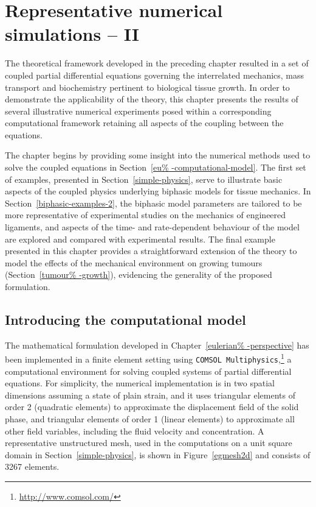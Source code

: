 \chapter{Representative numerical simulations -- II}
\label{numerical-simulations-2}

The theoretical framework developed in the preceding chapter resulted
in a set of coupled partial differential equations governing the
interrelated mechanics, mass transport and biochemistry pertinent to
biological tissue growth. In order to demonstrate the applicability of
the theory, this chapter presents the results of several illustrative
numerical experiments posed within a corresponding computational
framework retaining all aspects of the coupling between the equations.

The chapter begins by providing some insight into the numerical
methods used to solve the coupled equations in Section~\ref{eu%
  -computational-model}. The first set of examples, presented in
Section~\ref{simple-physics}, serve to illustrate basic aspects of the
coupled physics underlying biphasic models for tissue mechanics. In
Section~\ref{biphasic-examples-2}, the biphasic model parameters are
tailored to be more representative of experimental studies on the
mechanics of engineered ligaments, and aspects of the time- and rate-dependent
behaviour of the model are explored and compared with experimental
results. The final example presented in this chapter provides a
straightforward extension of the theory to model the effects of the
mechanical environment on growing tumours (Section~\ref{tumour%
  -growth}), evidencing the generality of the proposed formulation.

\section{Introducing the computational model}
\label{eu-computational-model}

The mathematical formulation developed in Chapter~\ref{eulerian%
  -perspective} has been implemented in a finite element setting using
{\tt COMSOL Multiphysics},\footnote{\href {http://www.comsol.com/}
  {http://www.comsol.com/}} a computational environment for solving
coupled systems of partial differential equations. For simplicity, the
numerical implementation is in two spatial dimensions assuming a state
of plain strain, and it uses triangular elements of order 2 (quadratic
elements) to approximate the displacement field of the solid phase,
and triangular elements of order 1 (linear elements) to approximate
all other field variables, including the fluid velocity and
concentration. A representative unstructured mesh, used in the
computations on a unit square domain in Section~\ref{simple-physics},
is shown in Figure~\ref{egmesh2d} and consists of 3267 elements.

